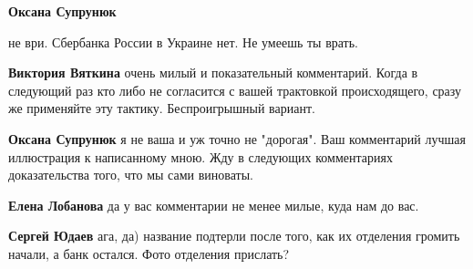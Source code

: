 \begin{itemize}
\begin{itemize}
 
\textbf{Оксана Супрунюк} 

не ври. Сбербанка России в Украине нет. Не умеешь ты врать.

 
\textbf{Виктория Вяткина} очень милый и показательный комментарий. Когда в следующий раз кто либо не согласится с вашей трактовкой происходящего, сразу же применяйте эту тактику. Беспроигрышный вариант.

 
\textbf{Оксана Супрунюк} я не ваша и уж точно не "дорогая". Ваш комментарий лучшая иллюстрация к написанному мною. Жду в следующих комментариях доказательства того, что мы сами виноваты.

 
\textbf{Елена Лобанова} да у вас комментарии не менее милые, куда нам до вас.

 
\textbf{Сергей Юдаев} ага, да) название подтерли после того, как их отделения громить начали, а банк остался. Фото отделения прислать?

 

\end{itemize}
\end{itemize}
